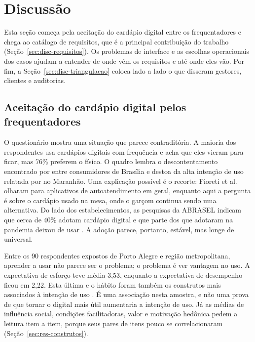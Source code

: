 \chapter{Discussão}
\label{ch:discussao}

Esta seção começa pela aceitação do cardápio digital entre os frequentadores e chega ao catálogo de requisitos, que é a principal contribuição do trabalho (Seção~\ref{sec:disc-requisitos}). Os problemas de interface e as escolhas operacionais dos casos ajudam a entender de onde vêm os requisitos e até onde eles vão. Por fim, a Seção~\ref{sec:disc-triangulacao} coloca lado a lado o que disseram gestores, clientes e auditorias.

\section{Aceitação do cardápio digital pelos frequentadores}
\label{sec:disc-adocao}

O questionário mostra uma situação que parece contraditória. A maioria dos respondentes usa cardápios digitais com frequência e acha que eles vieram para ficar, mas 76\% preferem o físico. O quadro lembra o descontentamento encontrado por  entre consumidores de Brasília e destoa da alta intenção de uso relatada por  no Maranhão. Uma explicação possível é o recorte: Fioreti et al. olharam para aplicativos de autoatendimento em geral, enquanto aqui a pergunta é sobre o cardápio usado na mesa, onde o garçom continua sendo uma alternativa. Do lado dos estabelecimentos, as pesquisas da ABRASEL indicam que cerca de 40\% adotam cardápio digital e que parte dos que adotaram na pandemia deixou de usar \cite{abrasel2023qrcode,abraselsc2025cardapio}. A adoção parece, portanto, estável, mas longe de universal.

Entre os 90 respondentes expostos de Porto Alegre e região metropolitana, aprender a usar não parece ser o problema; o problema é ver vantagem no uso. A expectativa de esforço teve média 3,53, enquanto a expectativa de desempenho ficou em 2,22. Esta última e o hábito foram também os construtos mais associados à intenção de uso \cite{venkatesh2012consumer,davis1989perceived}. É uma associação nesta amostra, e não uma prova de que tornar o digital mais útil aumentaria a intenção de uso. Já as médias de influência social, condições facilitadoras, valor e motivação hedônica pedem a leitura item a item, porque seus pares de itens pouco se correlacionaram (Seção~\ref{sec:res-construtos}).

